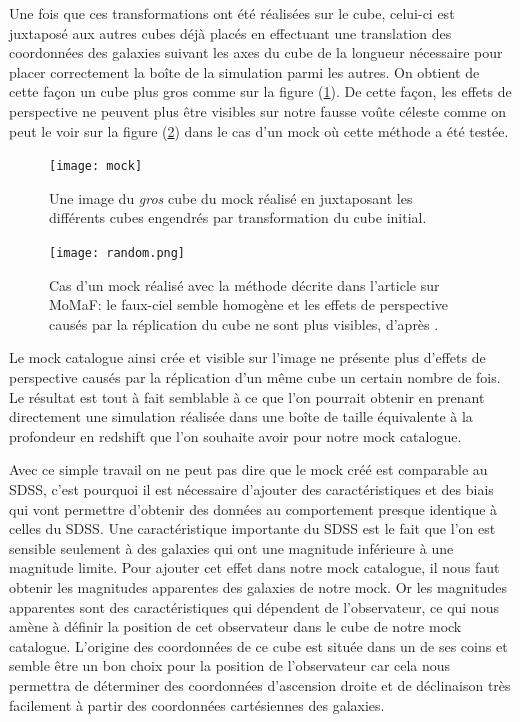 Une fois que ces transformations ont été réalisées sur le cube, celui-ci est juxtaposé aux autres cubes déjà placés en effectuant
une translation des coordonnées des galaxies suivant les axes du cube de la longueur nécessaire pour placer correctement la boîte
de la simulation parmi les autres. On obtient de cette façon un cube plus gros comme sur la figure
(\ref{fig:mock}). De cette façon, les effets de perspective ne peuvent plus être visibles sur notre fausse voûte
céleste comme on peut le voir sur la figure (\ref{fig:hom}) dans le cas d'un mock où cette méthode a été testée.
\begin{figure}[htb]
	\centering
	\texttt{[image: mock]}
	\caption{\footnotesize{}Une image du \emph{gros} cube du mock réalisé en juxtaposant les différents cubes engendrés par transformation du cube initial.}
	\label{fig:mock}
\end{figure}
\begin{figure}[htb]
	\centering
	\texttt{[image: random.png]}
	\caption{\footnotesize{}Cas d'un mock réalisé avec la méthode décrite dans l'article sur MoMaF: le faux-ciel semble
	homogène et les effets de perspective causés par la réplication du cube ne sont plus visibles, d'après \citet{Blaizot+05}.}
	\label{fig:hom}
\end{figure}
Le mock catalogue ainsi crée et visible sur l'image ne présente plus d'effets de perspective causés par la réplication d'un même
cube un certain nombre de fois. Le résultat est tout à fait semblable à ce que l'on pourrait obtenir en prenant directement une
simulation réalisée dans une boîte de taille équivalente à la profondeur en redshift que l'on souhaite avoir pour notre mock
catalogue.

Avec ce simple travail on ne peut pas dire que le mock créé est comparable au SDSS, c'est pourquoi il est nécessaire d'ajouter des
caractéristiques et des biais qui vont permettre d'obtenir des données au comportement presque identique à celles du SDSS.
Une caractéristique importante du SDSS est le fait que l'on est sensible seulement à des galaxies qui ont une magnitude inférieure
à une magnitude limite. Pour ajouter cet effet dans notre mock catalogue, il nous faut obtenir les magnitudes apparentes des
galaxies de notre mock. Or les magnitudes apparentes sont des caractéristiques qui dépendent de l'observateur, ce qui nous amène à
définir la position de cet observateur dans le cube de notre mock catalogue. L'origine des coordonnées de ce cube est située dans
un de ses coins et semble être un bon choix pour la position de l'observateur car cela nous permettra de déterminer des coordonnées
d'ascension droite et de déclinaison très facilement à partir des coordonnées cartésiennes des galaxies.

